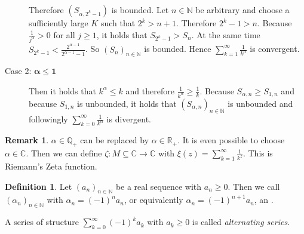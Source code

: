 \documentclass[a4paper,landscape,twocolumn]{article}
\theoremstyle{definition}
\newtheorem{defi}{Definition}
\newtheorem{rem}{Remark}
\newcommand\seq[1]{{\left(#1\right)}_{n \in \mathbb N}}
\begin{document}
\begin{description}
    Therefore $(S_{\alpha,2^k-1})$ is bounded.
    Let $n \in \mathbb N$ be arbitrary and choose a sufficiently large $K$ such that $2^k > n+1$. Therefore $2^k-1 > n$.
    Because $\frac{1}{j^\alpha} > 0$ for all $j \geq 1$, it holds that $S_{2^k-1} > S_n$.
    At the same time $S_{2^k-1} < \frac{2^{\alpha-1}}{2^{\alpha-1}-1}$. So $\seq{S_n}$ is bounded.
    Hence $\sum_{k=1}^\infty \frac{1}{k^\alpha}$ is convergent.
  \item[Case 2: $\mathbf{\alpha \leq 1}$]
    Then it holds that $k^\alpha \leq k$ and therefore $\frac{1}{k^\alpha} \geq \frac1{k}$.
    Because $S_{\alpha,n} \geq S_{1,n}$ and because $S_{1,n}$ is unbounded, it holds that
    $\seq{S_{\alpha,n}}$ is unbounded and followingly $\sum_{k=0}^\infty \frac1{k^\alpha}$ is divergent.
\end{description}

\begin{rem}
  $\alpha \in \mathbb Q_+$ can be replaced by $\alpha \in \mathbb R_+$.
  It is even possible to choose $\alpha \in \mathbb C$.
  Then we can define $\zeta: M \subseteq \mathbb C \rightarrow \mathbb C$
  with $\xi(z) = \sum_{k=1}^\infty \frac{1}{k^z}$.
  This is Riemann's Zeta function.
\end{rem}

\begin{defi}
  Let $\seq{a_n}$ be a real sequence with $a_n \geq 0$.
  Then we call $\seq{\alpha_n}$ with $\alpha_n = (-1)^n a_n$, or equivalently
  $\alpha_n = (-1)^{n+1} a_n$, an .

  A series of structure $\sum_{k=0}^\infty (-1)^k a_k$ with $a_k \geq 0$
  is called \emph{alternating series}.
\end{defi}
\end{document}
